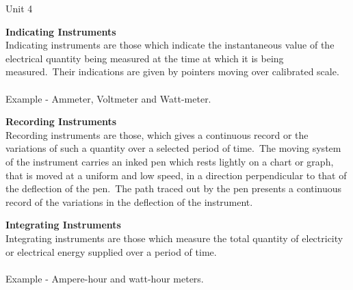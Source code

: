 \documentclass[11pt]{beamer}
\begin{document}
\begin{frame}[allowframebreaks]{Unit 4}
        \framebreak

        \textbf{Indicating Instruments} \\[10pt]

        Indicating instruments are those which indicate the instantaneous value of the electrical quantity being
        measured at the time at which it is being measured.\ Their indications are given by pointers moving over
        calibrated scale.
        \\~\\
        Example - Ammeter, Voltmeter and Watt-meter.

        \framebreak

        \textbf{Recording Instruments} \\[10pt]

        Recording instruments are those, which gives a continuous record or the variations of such a quantity over a
        selected period of time.\ The moving system of the instrument carries an inked pen which rests lightly on a
        chart or graph, that is moved at a uniform and low speed, in a direction perpendicular to that of the
        deflection of the pen.\ The path traced out by the pen presents a continuous record of the variations in the
        deflection of the instrument.

        \framebreak

        \textbf{Integrating Instruments} \\[10pt]

        Integrating instruments are those which measure the total quantity of electricity or electrical energy
        supplied over a period of time.
        \\~\\
        Example - Ampere-hour and watt-hour meters.
    \end{frame}
\end{document}
